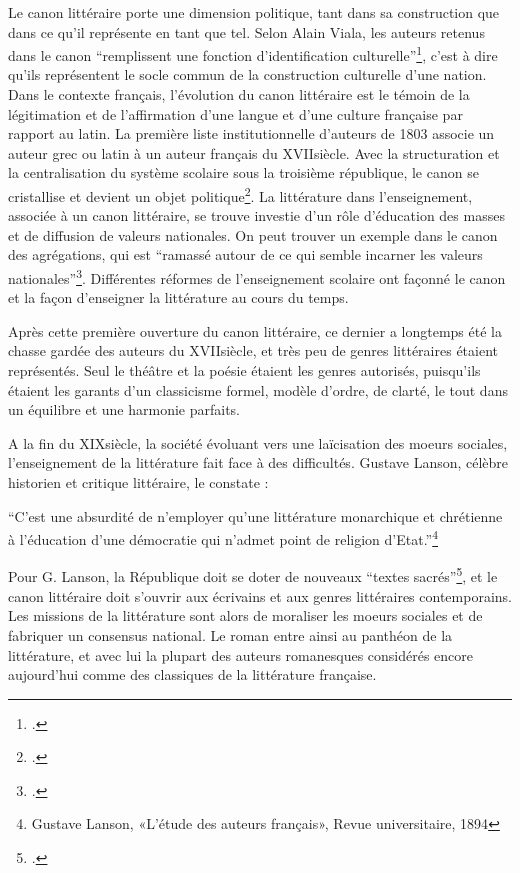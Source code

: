 Le canon littéraire porte une dimension politique, tant dans sa construction que dans ce qu'il représente en tant que tel. Selon Alain Viala, les auteurs retenus dans le canon \enquote{remplissent une fonction d’identification culturelle}\footcites{viala_quest-ce_1993}, c'est à dire qu'ils représentent le socle commun de la construction culturelle d'une nation. Dans le contexte français, l'évolution du canon littéraire est le témoin de la légitimation et de l'affirmation d'une langue et d'une culture française par rapport au latin. La première liste institutionnelle d'auteurs de 1803 associe un auteur grec ou latin à un auteur français du XVII\ieme siècle. Avec la structuration et la centralisation du système scolaire sous la troisième république, le canon se cristallise et devient un objet politique\footcites{compagnon_troisieme_1983}. La littérature dans l'enseignement, associée à un canon littéraire, se trouve investie d'un rôle d'éducation des masses et de diffusion de valeurs nationales. On peut trouver un exemple dans le canon des agrégations, qui est \enquote{ramassé autour de ce qui semble incarner les valeurs nationales}\footcites{jey_canon_2014}. Différentes réformes de l'enseignement scolaire ont façonné le canon et la façon d'enseigner la littérature au cours du temps.

Après cette première ouverture du canon littéraire, ce dernier a longtemps été la chasse gardée des auteurs du XVII\ieme siècle, et très peu de genres littéraires étaient représentés. Seul le théâtre et la poésie étaient les genres autorisés, puisqu'ils étaient les garants d'un classicisme formel, modèle d'ordre, de clarté, le tout dans un équilibre et une harmonie parfaits.

A la fin du XIX\ieme siècle, la société évoluant vers une laïcisation des moeurs sociales, l'enseignement de la littérature fait face à des difficultés. Gustave Lanson, célèbre historien et critique littéraire, le constate : 
\begin{displayquote} \enquote{C'est une absurdité de n'employer qu'une littérature monarchique et chrétienne à l'éducation d'une démocratie qui n'admet point de religion d'Etat.}\footnote{Gustave Lanson, «L'étude des auteurs français», Revue universitaire, 1894}
\end{displayquote}

Pour G. Lanson, la République doit se doter de nouveaux \enquote{textes sacrés}\footcites{compagnon_demon_1998}, et le canon littéraire doit s'ouvrir aux écrivains et aux genres littéraires contemporains. Les missions de la littérature sont alors de moraliser les moeurs sociales et de fabriquer un consensus national. Le roman entre ainsi au panthéon de la littérature, et avec lui la plupart des auteurs romanesques considérés encore aujourd'hui comme des classiques de la littérature française. 

